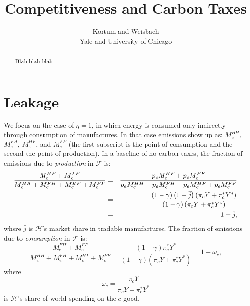 \documentclass[notitlepage,12pt]{article}
\begin{document}
\title{Competitiveness and Carbon Taxes}
\author{Kortum and Weisbach \\
Yale and University of Chicago}
\maketitle

\begin{abstract}
Blah blah blah
\end{abstract}

\section{Leakage}

We focus on the case of $\eta =1$, in which energy is consumed only
indirectly through consumption of manufactures. In that case emissions show
up as: $M_{e}^{HH}$, $M_{e}^{FH}$, $M_{e}^{HF}$, and $M_{e}^{FF}$ (the first
subscript is the point of consumption and the second the point of
production). In a baseline of no carbon taxes, the fraction of emissions due
to \emph{production} in $\mathcal{F}$ is:%
\begin{eqnarray*}
\frac{M_{e}^{HF}+M_{e}^{FF}}{M_{e}^{HH}+M_{e}^{FH}+M_{e}^{HF}+M_{e}^{FF}} &=&%
\frac{p_{e}M_{e}^{HF}+p_{e}M_{e}^{FF}}{%
p_{e}M_{e}^{HH}+p_{e}M_{e}^{FH}+p_{e}M_{e}^{HF}+p_{e}M_{e}^{FF}} \\
&=&\frac{\left( 1-\gamma \right) \left( 1-\bar{j}\right) \left( \pi
_{c}Y+\pi _{c}^{\ast }Y^{\ast }\right) }{\left( 1-\gamma \right) \left( \pi
_{c}Y+\pi _{c}^{\ast }Y^{\ast }\right) } \\
&=&1-\bar{j},
\end{eqnarray*}%
where $\bar{j}$ is $\mathcal{H}$'s market share in tradable manufactures.
The fraction of emissions due to \emph{consumption} in $\mathcal{F}$ is:%
\begin{equation*}
\frac{M_{e}^{FH}+M_{e}^{FF}}{M_{e}^{HH}+M_{e}^{FH}+M_{e}^{HF}+M_{e}^{FF}}=%
\frac{\left( 1-\gamma \right) \pi _{c}^{\ast }Y^{\ast }}{\left( 1-\gamma
\right) \left( \pi _{c}Y+\pi _{c}^{\ast }Y^{\ast }\right) }=1-\omega _{c},
\end{equation*}%
where%
\begin{equation*}
\omega _{c}=\frac{\pi _{c}Y}{\pi _{c}Y+\pi _{c}^{\ast }Y^{\ast }}
\end{equation*}%
is $\mathcal{H}$'s share of world spending on the $c$-good.
\end{document}
